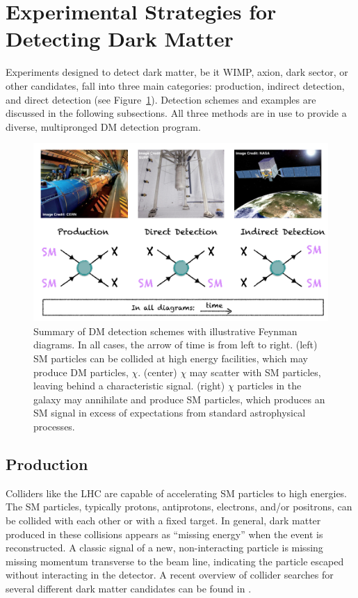 \section{Experimental Strategies for Detecting Dark Matter}
\label{sec:dm_detection_schemes}
Experiments designed to detect dark matter, be it \ac{WIMP}, axion, dark sector, or other candidates, fall into three main categories: production, indirect detection, and direct detection (see Figure~\ref{fig:dm_detection_schemes}). Detection schemes and examples are discussed in the following subsections. All three methods are in use to provide a diverse, multipronged \ac{DM} detection program. 

\begin{figure}[htbp]
\begin{center}
\includegraphics[width=\textwidth]{figures/theory/dm_detection_schemes.png}
\caption{Summary of \acs{DM} detection schemes with illustrative Feynman diagrams. In all cases, the arrow of time is from left to right. (left) \acs{SM} particles can be collided at high energy facilities, which may produce \acs{DM} particles, $\chi$. (center) $\chi$ may scatter with \acs{SM} particles, leaving behind a characteristic signal. (right) $\chi$ particles in the galaxy may annihilate and produce \acs{SM} particles, which produces an \acs{SM} signal in excess of expectations from standard astrophysical processes.}
\label{fig:dm_detection_schemes}
\end{center}
\end{figure}

\subsection{Production}
Colliders like the \ac{LHC} are capable of accelerating \ac{SM} particles to high energies. The \ac{SM} particles, typically protons, antiprotons, electrons, and/or positrons, can be collided with each other or with a fixed target. In general, dark matter produced in these collisions appears as ``missing energy'' when the event is reconstructed. A classic signal of a new, non-interacting particle is missing missing momentum transverse to the beam line, indicating the particle escaped without interacting in the detector. A recent overview of collider searches for several different dark matter candidates can be found in \cite{Penning2018}. 

